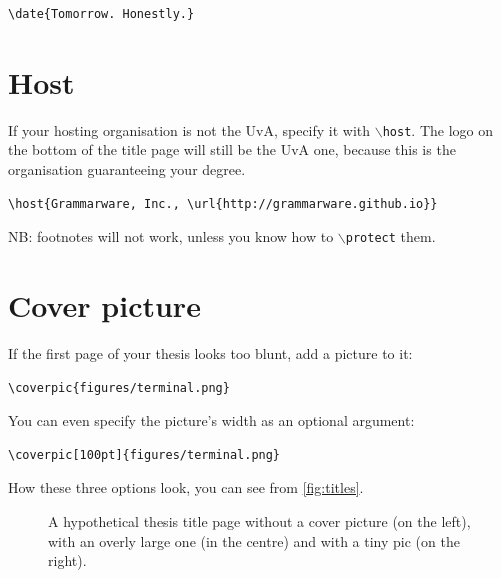 \documentclass{uvamscse}
\newcommand{\cmd}[1]{\texttt{$\backslash$#1}}
\begin{document}
\begin{snippet}
\begin{verbatim}
\date{Tomorrow. Honestly.}
\end{verbatim}
\end{snippet}

\section{Host}

If your hosting organisation is not the UvA, specify it with \cmd{host}. The
logo on the bottom of the title page will still be the UvA one, because this
is the organisation guaranteeing your degree.

\begin{snippet}
\begin{verbatim}
\host{Grammarware, Inc., \url{http://grammarware.github.io}}
\end{verbatim}
\end{snippet}

NB: footnotes will not work, unless you know how to \cmd{protect} them.

\section{Cover picture}

If the first page of your thesis looks too blunt, add a picture to it:

\begin{snippet}
\begin{verbatim}
\coverpic{figures/terminal.png}
\end{verbatim}
\end{snippet}

You can even specify the picture's width as an optional argument:

\begin{snippet}
\begin{verbatim}
\coverpic[100pt]{figures/terminal.png}
\end{verbatim}
\end{snippet}

How these three options look, you can see from \autoref{fig:titles}.

\begin{figure}[t]
  \hfill
  \hfill
  \caption{A hypothetical thesis title page without a cover picture (on the left), with an overly large one (in the centre) and with a tiny pic (on the right).}
  \label{fig:titles}
\end{figure}
\end{document}
